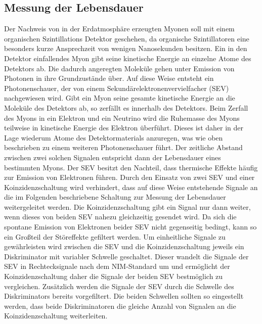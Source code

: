 \subsection{Messung der Lebensdauer}
\label{subsec:Messung der Lebensdauer}
Der Nachweis von in der Erdatmosphäre erzeugten Myonen soll mit einem organischen Szintillations Detektor geschehen, da organische Szintillatoren eine besonders kurze Ansprechzeit von wenigen Nanosekunden besitzen.
Ein in den Detektor einfallendes Myon gibt seine kinetische Energie an einzelne Atome des Detektors ab.
Die dadurch angeregten Moleküle gehen unter Emission von Photonen in ihre Grundzustände über.
Auf diese Weise entsteht ein Photonenschauer, der von einem Sekundärelektronenvervielfacher (SEV) nachgewiesen wird.
Gibt ein Myon seine gesamte kinetische Energie an die Moleküle des Detektors ab, so zerfällt es innerhalb des Detektors.
Beim Zerfall des Myons in ein Elektron und ein Neutrino wird die Ruhemasse des Myons teilweise in kinetische Energie des Elektron überführt.
Dieses ist daher in der Lage wiederum Atome des Detektormaterials anzuregen, was wie oben beschrieben zu einem weiteren Photonenschauer führt.
Der zeitliche Abstand zwischen zwei solchen Signalen entspricht dann der Lebensdauer eines bestimmten Myons.
Der SEV besitzt den Nachteil, dass thermische Effekte häufig zur Emission von Elektronen führen.
Durch den Einsatz von zwei SEV und einer Koinzidenzschaltung wird verhindert, dass auf diese Weise entstehende Signale an die im Folgenden beschriebene Schaltung zur Messung der Lebensdauer weitergeleitet werden.
Die Koinzidenzschaltung gibt ein Signal nur dann weiter, wenn dieses von beiden SEV nahezu gleichzeitig gesendet wird.
Da sich die spontane Emission von Elektronen beider SEV nicht gegenseitig bedingt, kann so ein Großteil der Störeffekte gefiltert werden.
Um einheitliche Signale zu gewährleisten wird zwischen die SEV und die Koinzidenzschaltung jeweils ein Diskriminator mit variabler Schwelle geschaltet.
Dieser wandelt die Signale der SEV in Rechtecksignale nach dem NIM-Standard um und ermöglicht der Koinzidenzschaltung daher die Signale der beiden SEV bestmöglich zu vergleichen.
Zusätzlich werden die Signale der SEV durch die Schwelle des Diskriminators bereits vorgefiltert.
Die beiden Schwellen sollten so eingestellt werden, dass beide Diskriminatoren die gleiche Anzahl von Signalen an die Koinzidenzschaltung weiterleiten.

